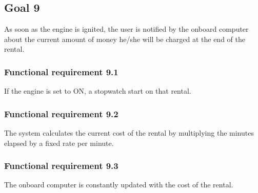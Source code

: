 \subsection{Goal 9}
As soon as the engine is ignited, the user is notified by the onboard computer about the current amount of money he/she will be charged at the end of the rental.

\setcounter{secnumdepth}{3}
\subsubsection{Functional requirement 9.1}
If the engine is set to ON, a stopwatch start on that rental.

\subsubsection{Functional requirement 9.2}
The system calculates the current cost of the rental by multiplying the minutes elapsed by a fixed rate per minute.

\subsubsection{Functional requirement 9.3}
The onboard computer is constantly updated with the cost of the rental.